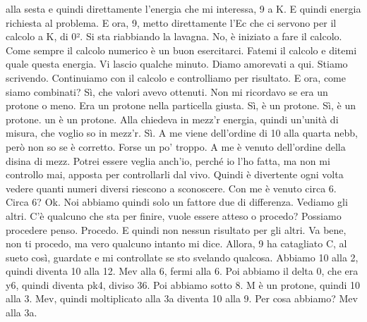 \begin{soluzione}
{   alla sesta e quindi direttamente l'energia che mi interessa, 9 a K. E quindi energia richiesta al problema. E ora, 9, metto direttamente l'Ec che ci servono per il calcolo a K, di 0². Si sta riabbiando la lavagna. No, è iniziato a fare il calcolo. Come sempre il calcolo numerico è un buon esercitarci. Fatemi il calcolo e ditemi quale questa energia. Vi lascio qualche minuto. Diamo amorevati a qui. Stiamo scrivendo. Continuiamo con il calcolo e controlliamo per risultato. E ora, come siamo combinati? Sì, che valori avevo ottenuti. Non mi ricordavo se era un protone o meno. Era un protone nella particella giusta. Sì, è un protone. Sì, è un protone. un è un protone. Alla chiedeva in mezz'r energia, quindi un'unità di misura, che voglio so in mezz'r. Sì. A me viene dell'ordine di 10 alla quarta nebb, però non so se è corretto. Forse un po' troppo. A me è venuto dell'ordine della disina di mezz. Potrei essere veglia anch'io, perché io l'ho fatta, ma non mi controllo mai, apposta per controllarli dal vivo. Quindi è divertente ogni volta vedere quanti numeri diversi riescono a sconoscere. Con me è venuto circa 6. Circa 6? Ok. Noi abbiamo quindi solo un fattore due di differenza. Vediamo gli altri. C'è qualcuno che sta per finire, vuole essere atteso o procedo? Possiamo procedere penso. Procedo. E quindi non nessun risultato per gli altri. Va bene, non ti procedo, ma vero qualcuno intanto mi dice. Allora, 9 ha catagliato C, al sueto così, guardate e mi controllate se sto svelando qualcosa. Abbiamo 10 alla 2, quindi diventa 10 alla 12. Mev alla 6, fermi alla 6. Poi abbiamo il delta 0, che era y6, quindi diventa pk4, diviso 36. Poi abbiamo sotto 8. M è un protone, quindi 10 alla 3. Mev, quindi moltiplicato alla 3a diventa 10 alla 9. Per cosa abbiamo? Mev alla 3a. 
   
}
\end{soluzione}
